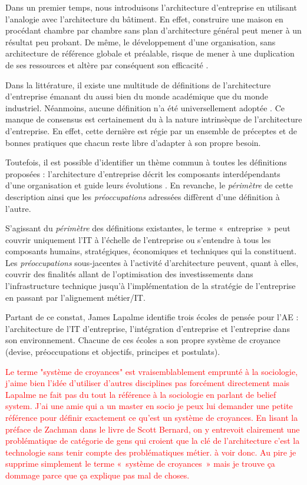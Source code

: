 Dans un premier temps, nous introduisons  l'architecture d'entreprise en 
utilisant l'analogie avec l'architecture du bâtiment. En effet, construire une 
maison en 
procédant chambre par chambre sans plan d'architecture général peut mener à un 
résultat peu probant. De même, le développement d'une organisation, sans 
architecture de référence globale et préalable, risque de mener à une 
duplication de ses ressources et altère par conséquent son efficacité 
\cite{bernard2012introduction}.

Dans la littérature, il existe une multitude de définitions de l'architecture 
d'entreprise émanant du aussi bien du monde académique que du monde industriel. 
Néanmoins, aucune définition n'a été universellement adoptée 
\cite{mentz2012comparison} \cite{ranganathan2005enterprise}. Ce manque de 
consensus est certainement du à la nature intrinsèque de l'architecture 
d'entreprise. En effet, cette dernière est 
régie par un ensemble de préceptes et de bonnes pratiques que chacun reste libre 
d'adapter à son propre besoin. 

Toutefois, il est possible d'identifier un thème commun à toutes les définitions 
proposées : l'architecture d'entreprise décrit les composants interdépendants 
d'une organisation et guide leurs évolutions \cite{lapalme2012three}. En 
revanche, le 
\textit{périmètre} de cette description ainsi que les \textit{préoccupations} 
adressées diffèrent d'une définition à l'autre.

S'agissant du \textit{périmètre} des définitions existantes, le terme 
«~entreprise~» peut couvrir uniquement l'IT à l'échelle de l'entreprise ou 
s'entendre à tous les composants humains, stratégiques, économiques et 
techniques qui la 
constituent. Les \textit{préoccupations} sous-jacentes à l'activité 
d'architecture peuvent, quant à elles, couvrir des finalités allant de 
l'optimisation des investissements dans l'infrastructure technique jusqu'à 
l'implémentation de la stratégie de l'entreprise en passant par l'alignement 
métier/IT. 

Partant de ce constat, James Lapalme identifie trois écoles de pensée pour l'AE 
\cite{lapalme2012three} : l'architecture de l'IT d'entreprise, l'intégration 
d'entreprise et l'entreprise dans son environnement. Chacune de ces écoles a son 
propre système de croyance (devise, préoccupations et objectifs, principes et 
postulats).


\textcolor{red}{Le terme "système de croyances" est vraisemblablement emprunté 
à la  sociologie, j'aime bien l'idée d'utiliser d'autres disciplines pas 
forcément directement mais Lapalme ne fait pas du tout la référence à la 
sociologie en parlant de belief system. J'ai une amie qui a un master en socio 
je peux lui demander une petite référence pour définir exactement ce qu'est un 
système de croyances. En lisant la préface de Zachman dans le livre de Scott 
Bernard, on y 
entrevoit clairement une problématique de catégorie de gens qui croient que la 
clé de l'architecture c'est la technologie sans  tenir compte des 
problématiques métier. à voir donc. Au pire je supprime simplement le terme 
«~système de croyances~» mais je trouve ça dommage parce que ça explique pas mal 
de choses.}




